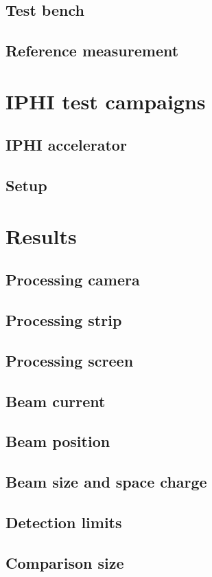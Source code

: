 \begin{refsection}
	\subsection{Test bench}
	\subsection{Reference measurement}
	\section{IPHI test campaigns}
	\subsection{IPHI accelerator}
	\subsection{Setup}

	\section{Results}
	\subsection{Processing camera}
	\subsection{Processing strip}
	\subsection{Processing screen}
	\subsection{Beam current}
	\subsection{Beam position}
	\subsection{Beam size and space charge}
	\subsection{Detection limits}
	\subsection{Comparison size}

\end{refsection}
